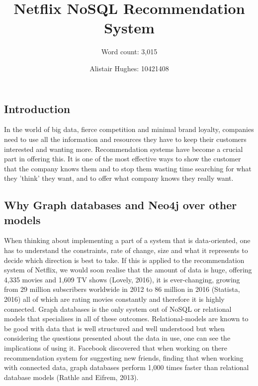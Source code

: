 \documentclass[a4paper]{article}
\begin{document}
\title{Netflix NoSQL Recommendation System}
\author{Word count: 3,015} \par
\author{Alistair Hughes: 10421408}
\justify

\subsection{Introduction}

In the world of big data, fierce competition and minimal brand loyalty, companies need to use all the information and resources they have to keep their customers interested and wanting more. Recommendation systems have become a crucial part in offering this. It is one of the most effective ways to show the customer that the company knows them and to stop them wasting time searching for what they 'think' they want, and to offer what company knows they really want.

\subsection{Why Graph databases and Neo4j over other models}

When thinking about implementing a part of a system that is data-oriented, one has to understand the constraints, rate of change, size and what it represents to decide which direction is best to take. If this is applied to the recommendation system of Netflix, we would soon realise that the amount of data is huge, offering 4,335 movies and 1,609 TV shows (Lovely, 2016), it is ever-changing, growing from 29 million subscribers worldwide in 2012 to 86 million in 2016 (Statista, 2016) all of which are rating movies constantly and therefore it is highly connected. Graph databases is the only system out of NoSQL or relational models that specialises in all of these outcomes. Relational-models are known to be good with data that is well structured and well understood but when considering the questions presented about the data in use, one can see the implications of using it. Facebook discovered that when working on there recommendation system for suggesting new friends, finding that when working with connected data, graph databases perform 1,000 times faster than relational database models (Rathle and Eifrem, 2013).
\end{document}
